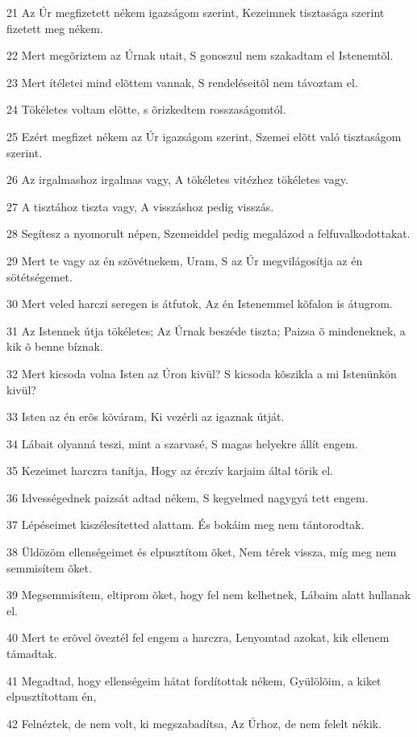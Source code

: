 \par 21 Az Úr megfizetett nékem igazságom szerint, Kezeimnek tisztasága szerint fizetett meg nékem.
\par 22 Mert megõriztem az Úrnak utait, S gonoszul nem szakadtam el Istenemtõl.
\par 23 Mert ítéletei mind elõttem vannak, S rendeléseitõl nem távoztam el.
\par 24 Tökéletes voltam elõtte, s õrizkedtem rosszaságomtól.
\par 25 Ezért megfizet nékem az Úr igazságom szerint, Szemei elõtt való tisztaságom szerint.
\par 26 Az irgalmashoz irgalmas vagy, A tökéletes vitézhez tökéletes vagy.
\par 27 A tisztához tiszta vagy, A visszáshoz pedig visszás.
\par 28 Segítesz a nyomorult népen, Szemeiddel pedig megalázod a felfuvalkodottakat.
\par 29 Mert te vagy az én szövétnekem, Uram, S az Úr megvilágosítja az én sötétségemet.
\par 30 Mert veled harczi seregen is átfutok, Az én Istenemmel kõfalon is átugrom.
\par 31 Az Istennek útja tökéletes; Az Úrnak beszéde tiszta; Paizsa õ mindeneknek, a kik õ benne bíznak.
\par 32 Mert kicsoda volna Isten az Úron kivül? S kicsoda kõszikla a mi Istenünkön kivül?
\par 33 Isten az én erõs kõváram, Ki vezérli az igaznak útját.
\par 34 Lábait olyanná teszi, mint a szarvasé, S magas helyekre állít engem.
\par 35 Kezeimet harczra tanítja, Hogy az érczív karjaim által törik el.
\par 36 Idvességednek paizsát adtad nékem, S kegyelmed nagygyá tett engem.
\par 37 Lépéseimet kiszélesítetted alattam. És bokáim meg nem tántorodtak.
\par 38 Üldözöm ellenségeimet és elpusztítom õket, Nem térek vissza, míg meg nem semmisítem õket.
\par 39 Megsemmisítem, eltiprom õket, hogy fel nem kelhetnek, Lábaim alatt hullanak el.
\par 40 Mert te erõvel öveztél fel engem a harczra, Lenyomtad azokat, kik ellenem támadtak.
\par 41 Megadtad, hogy ellenségeim hátat fordítottak nékem, Gyülölõim, a kiket elpusztítottam én,
\par 42 Felnéztek, de nem volt, ki megszabadítsa, Az Úrhoz, de nem felelt nékik.
